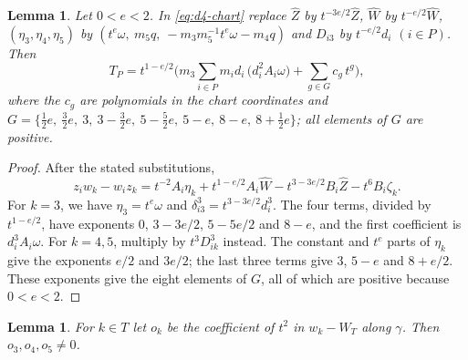 \documentclass[11pt]{amsart}
\newtheorem{lemma}[theorem]{Lemma}
\theoremstyle{definition}
\theoremstyle{remark}
\begin{document}
{\begin{lemma}\label{lem:d4-torque}
Let $0<e<2$.  In \eqref{eq:d4-chart} replace $\hat Z$ by $t^{-3e/2}\hat Z$, $\hat W$ by
$t^{-e/2}\hat W$, $(\eta_3,\eta_4,\eta_5)$ by $(t^e\omega,\ m_5q,\ -m_3m_5^{-1}t^e\omega-m_4q)$ and
$D_{i3}$ by $t^{-e/2}d_i$ $(i\in P)$.  Then
\[
  T_P=t^{1-e/2}\Big(m_3\sum_{i\in P}m_id_i\,\big(d_i^2A_i\omega\big)+\sum_{g\in G}c_g\,t^g\Big),
\]
where the $c_g$ are polynomials in the chart coordinates and
$G=\{\tfrac12e,\ \tfrac32e,\ 3,\ 3-\tfrac32e,\ 5-\tfrac52e,\ 5-e,\ 8-e,\ 8+\tfrac12e\}$; all
elements of $G$ are positive.
\end{lemma}
\begin{proof}
After the stated substitutions,
\[
 z_iw_k-w_iz_k
 =t^{-2}A_i\eta_k+t^{1-e/2}A_i\hat W
       -t^{3-3e/2}B_i\hat Z-t^6B_i\zeta_k.
\]
For $k=3$, we have $\eta_3=t^e\omega$ and
$\delta_{i3}^3=t^{3-3e/2}d_i^3$.  The four terms, divided by
$t^{1-e/2}$, have exponents
$0$, $3-3e/2$, $5-5e/2$ and $8-e$, and the first coefficient is
$d_i^3A_i\omega$.
For $k=4,5$, multiply by $t^3D_{ik}^3$ instead.  The constant and
$t^e$ parts of $\eta_k$ give the exponents $e/2$ and $3e/2$;
the last three terms give $3$, $5-e$ and $8+e/2$.
These exponents give the eight elements of $G$, all of which are positive
because $0<e<2$.
\end{proof}

}\begin{lemma}\label{lem:d4-central}
For $k\in T$ let $o_k$ be the coefficient of $t^2$ in $w_k-W_T$ along $\gamma$.  Then
$o_3,o_4,o_5\ne0$.
\end{lemma}
\end{document}
